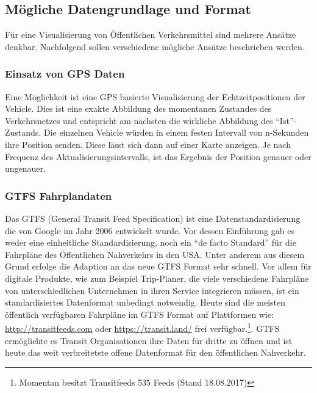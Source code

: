\subsection{Mögliche Datengrundlage und Format}
\label{sub:mögliche_datengrundlage_und_format}
  Für eine Visualisierung von Öffentlichen Verkehrsmittel sind mehrere Ansätze denkbar. Nachfolgend sollen verschiedene mögliche Ansätze beschrieben werden.

  \subsubsection{Einsatz von GPS Daten}
  \label{ssub:einsatz_von_gps_daten}
    Eine Möglichkeit ist eine GPS basierte Visualisierung der Echtzeitpositionen der Vehicle. Dies ist eine exakte Abbildung des momentanen Zustandes des Verkehrsnetzes und entspricht am nächsten die wirkliche Abbildung des "`Ist"'-Zustands. Die einzelnen Vehicle würden in einem festen Intervall von n-Sekunden ihre Position senden. Diese lässt sich dann auf einer Karte anzeigen. Je nach Frequenz des Aktualisierungsintervalls, ist das Ergebnis der Position genauer oder ungenauer.


    \subsubsection{GTFS Fahrplandaten}
    \label{ssub:gtfs_fahrplandaten}
      Das GTFS (General Transit Feed Specification) ist eine Datenstandardisierung die von Google im Jahr 2006 entwickelt wurde. Vor dessen Einführung gab es weder eine einheitliche Standardisierung, noch ein "`de facto Standard"' für die Fahrpläne des Öffentlichen Nahverkehrs in den USA. Unter anderem aus diesem Grund erfolge die Adaption an das neue GTFS Format sehr schnell. Vor allem für digitale Produkte, wie zum Beispiel Trip-Planer, die viele verschiedene Fahrpläne von unterschiedlichen Unternehmen in ihren Service integrieren müssen, ist ein standardisiertes Datenformat unbedingt notwendig. Heute sind die meisten öffentlich verfügbaren Fahrpläne im GTFS Format auf Plattformen wie: \url{http://transitfeeds.com} oder \url{https://transit.land/} frei verfügbar.\footnote{Momentan besitzt Transitfeeds 535 Feeds (Stand 18.08.2017)}. GTFS ermöglichte es Transit Organisationen ihre Daten für dritte zu öffnen und ist heute das weit verbreitetste offene Datenformat für den öffentlichen Nahverkehr.\parencite[S. 2]{roush}\\

